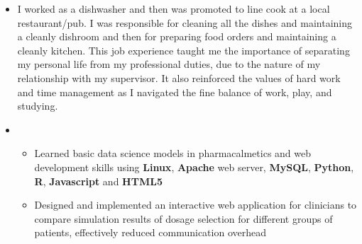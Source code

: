 \documentclass[11pt,a4paper,sans]{moderncv}        %
\begin{document}
\begin{itemize}
	\vspace{6pt}

	\item{
		{\vspace{3pt}
			I worked as a dishwasher and then was promoted to line cook at a local restaurant/pub. I was responsible for cleaning all the dishes and maintaining a cleanly dishroom and then for preparing food orders and maintaining a cleanly kitchen. This job experience taught me the importance of separating my personal life from my professional duties, due to the nature of my relationship with my supervisor. It also reinforced the values of hard work and time management as I navigated the fine balance of work, play, and studying.}}

	\vspace{6pt}

	\item{
		{\vspace{3pt}
			\begin{itemize} pt
				\item Learned basic data science models in pharmacalmetics and web development skills using \textbf{Linux}, \textbf{Apache} web server, \textbf{MySQL}, \textbf{Python}, \textbf{R}, \textbf{Javascript} and \textbf{HTML5} %
				\item %
				Designed and implemented an interactive web application for clinicians to compare simulation results of dosage selection for different groups of patients, effectively reduced communication overhead  
			\end{itemize}}}


\end{itemize}
\end{document}
